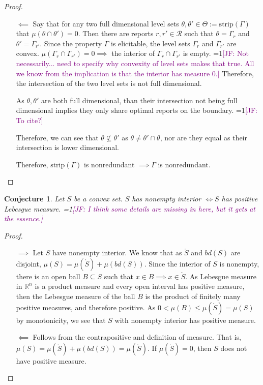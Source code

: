 \documentclass[12pt]{article}
\newcommand{\Comments}{1}
\newcommand{\mynote}[2]{\ifnum\Comments=1\textcolor{#1}{#2}\fi}
\newcommand{\jessie}[1]{\mynote{purple}{[JF: #1]}}
\newcommand{\reals}{\mathbb{R}}
\newcommand{\R}{\mathcal{R}}
\newcommand{\inter}[1]{\mathring{#1}}%
\newcommand{\strip}{\text{strip}}
\newtheorem{conjecture}{Conjecture}
\begin{document}
\begin{proof}
\begin{enumerate}
		
		\item[$\impliedby$] 
		Say that for any two full dimensional level sets $\theta, \theta' \in \Theta := \strip(\Gamma)$ that $\mu(\theta \cap \theta') = 0$.
		Then there are reports $r, r' \in \R$ such that $\theta = \Gamma_r$ and $\theta' = \Gamma_{r'}$.
		Since the property $\Gamma$ is elicitable, the level sets $\Gamma_r$ and $\Gamma_{r'}$ are convex.
		$\mu(\Gamma_r \cap \Gamma_{r'}) = 0 \implies$ the interior of $\Gamma_r \cap \Gamma_{r'}$ is empty.
		\jessie{Not necessarily... need to specify why convexity of level sets makes that true.
		All we know from the implication is that the interior has measure 0.}
		Therefore, the intersection of the two level sets is not full dimensional.
		
		As $\theta, \theta'$ are both full dimensional, than their intersection not being full dimensional implies they only share optimal reports on the boundary. \jessie{To cite?}
		
		Therefore, we can see that $\theta \not \subseteq \theta'$ as $\theta \neq \theta' \cap \theta$, nor are they equal as their intersection is lower dimensional.
		
		Therefore, $\strip(\Gamma)$ is nonredundant $\implies \Gamma$ is nonredundant.
	\end{enumerate}
	
\end{proof}


\begin{conjecture}\label{conj:pos-measure-iff-nonempty-int}
Let $S$ be a convex set.
$S$ has nonempty interior $\iff S$ has positive Lebesgue measure.
\jessie{I think some details are missing in here, but it gets at the essence.}
\end{conjecture}
\begin{proof}

\begin{enumerate}
\item[$\implies$]
Let $S$ have nonempty interior.
We know that as $\inter{S}$ and $bd(S)$ are disjoint, $\mu(S) = \mu(\inter{S}) + \mu(bd(S))$.
Since the interior of $S$ is nonempty, there is an open ball $B \subseteq S$ such that $x \in B \implies x \in \inter S$.
As Lebesgue measure in $\reals^n$ is a product measure and every open interval has positive measure, then the Lebesgue measure of the ball $B$ is the product of finitely many positive measures, and therefore positive.
As $0 < \mu(B) \leq \mu(\inter S) = \mu(S)$ by monotonicity, we see that $S$ with nonempty interior has positive measure.

\item[$\impliedby$]  Follows from the contrapositive and definition of measure.
That is, $\mu(S) = \mu(\inter{S}) + \mu(bd(S)) = \mu(\inter{S})$.
If $\mu(\inter{S}) = 0$, then $S$ does not have positive measure.
\end{enumerate}
\end{proof}
\end{document}
